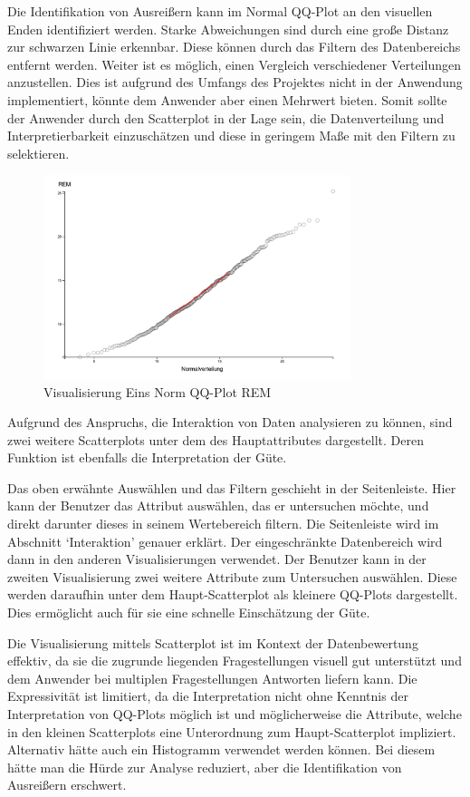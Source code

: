 \documentclass[usegeometry=true]{scrartcl}
\begin{document}
Die Identifikation von Ausreißern kann im Normal QQ-Plot an den visuellen Enden identifiziert werden. Starke Abweichungen sind durch eine große Distanz zur schwarzen Linie erkennbar. Diese können durch das Filtern des Datenbereichs entfernt werden. Weiter ist es möglich, einen Vergleich verschiedener Verteilungen anzustellen. Dies ist aufgrund des Umfangs des Projektes nicht in der Anwendung implementiert, könnte dem Anwender aber einen Mehrwert bieten. Somit sollte der Anwender durch den Scatterplot in der Lage sein, die Datenverteilung und Interpretierbarkeit einzuschätzen und diese in geringem Maße mit den Filtern zu selektieren.

\begin{figure}[h]
  \centering
  \includegraphics [width = 0.8\textwidth]{NormQQPlott.JPG}
  \caption{Visualisierung Eins  Norm QQ-Plot REM }
\end{figure}


Aufgrund des Anspruchs, die Interaktion von Daten analysieren zu können, sind zwei weitere Scatterplots unter dem des Hauptattributes dargestellt. Deren Funktion ist ebenfalls die Interpretation der Güte.

Das oben erwähnte Auswählen und das Filtern geschieht in der Seitenleiste. Hier kann der Benutzer das Attribut auswählen, das er untersuchen möchte, und direkt darunter dieses in seinem Wertebereich filtern. Die Seitenleiste wird im Abschnitt `Interaktion' genauer erklärt.
Der eingeschränkte Datenbereich wird dann in den anderen Visualisierungen verwendet.
Der Benutzer kann in der zweiten Visualisierung zwei weitere Attribute zum Untersuchen auswählen. Diese werden daraufhin unter dem Haupt-Scatterplot als kleinere QQ-Plots dargestellt. Dies ermöglicht auch für sie eine schnelle Einschätzung der Güte.

Die Visualisierung mittels Scatterplot ist im Kontext der Datenbewertung effektiv, da sie die zugrunde liegenden Fragestellungen visuell gut unterstützt und dem Anwender bei multiplen Fragestellungen Antworten liefern kann. Die Expressivität ist limitiert, da die Interpretation nicht ohne Kenntnis der Interpretation von QQ-Plots möglich ist und möglicherweise die Attribute, welche in den kleinen Scatterplots eine Unterordnung zum Haupt-Scatterplot impliziert.
Alternativ hätte auch ein Histogramm verwendet werden können. Bei diesem hätte man die Hürde zur Analyse reduziert, aber die Identifikation von Ausreißern erschwert.
\end{document}
